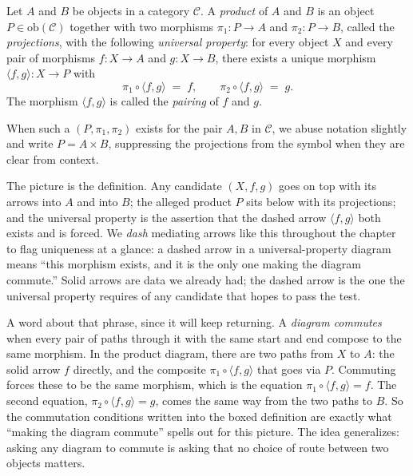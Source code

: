 \begin{definition}\label{def:product}
Let $A$ and $B$ be objects in a category $\mathcal{C}$. A
\textit{product} of $A$ and $B$ is an object
$P \in \mathrm{ob}(\mathcal{C})$ together with two morphisms
$\pi_1 : P \to A$ and $\pi_2 : P \to B$, called the
\textit{projections}, with the following \textit{universal
property}: for every object $X$ and
every pair of morphisms $f : X \to A$ and $g : X \to B$, there exists a
unique morphism $\langle f, g \rangle : X \to P$ with
\[ \pi_1 \circ \langle f, g \rangle \; = \; f, \qquad
   \pi_2 \circ \langle f, g \rangle \; = \; g. \]
The morphism $\langle f, g \rangle$ is called the
\textit{pairing} of $f$ and $g$.

\begin{center}
\end{center}

\noindent When such a $(P, \pi_1, \pi_2)$ exists for the pair $A, B$ in
$\mathcal{C}$, we abuse notation slightly and write $P = A \times B$,
suppressing the projections from the symbol when they are clear from
context.
\end{definition}

\noindent The picture is the definition. Any candidate $(X, f, g)$ goes on
top with its arrows into $A$ and into $B$; the alleged product $P$ sits
below with its projections; and the universal property is the assertion
that the dashed arrow $\langle f, g \rangle$ both exists and is forced.
We \textit{dash} mediating arrows like this throughout the chapter to
flag uniqueness at a glance: a dashed arrow in a universal-property
diagram means ``this morphism exists, and it is the only one making the
diagram commute.'' Solid arrows are data we already had; the dashed arrow
is the one the universal property requires of any candidate that hopes
to pass the test.

\noindent A word about that phrase, since it will keep returning. A
\textit{diagram commutes}
when every pair of paths through it with the same start and end compose
to the same morphism. In the product diagram, there are two paths from
$X$ to $A$: the solid arrow $f$ directly, and the composite $\pi_1 \circ
\langle f, g \rangle$ that goes via $P$. Commuting forces these to be the
same morphism, which is the equation $\pi_1 \circ \langle f, g \rangle =
f$. The second equation, $\pi_2 \circ \langle f, g \rangle = g$, comes
the same way from the two paths to $B$. So the commutation conditions
written into the boxed definition are exactly what ``making the diagram
commute'' spells out for this picture. The idea generalizes: asking any
diagram to commute is asking that no choice of route between two objects
matters.


